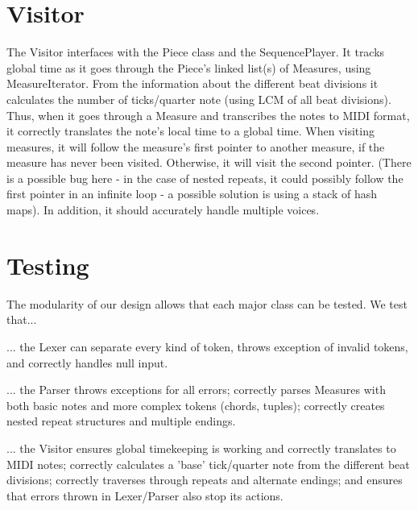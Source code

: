 \documentclass{amsart}
\begin{document}
\section{ Visitor }
The Visitor interfaces with the Piece class and the SequencePlayer.  It tracks global time as it goes through the Piece's linked list(s) of Measures, using MeasureIterator.  From the information about the different beat divisions it calculates the number of ticks/quarter note (using LCM of all beat divisions).  Thus, when it goes through a Measure and transcribes the notes to MIDI format, it correctly translates the note's local time to a global time.  When visiting measures, it will follow the measure's first pointer to another measure, if the measure has never been visited.  Otherwise, it will visit the second pointer.  (There is a possible bug here - in the case of nested repeats, it could possibly follow the first pointer in an infinite loop - a possible solution is using a stack of hash maps).  In addition, it should accurately handle multiple voices.  

\section{ Testing }
The modularity of our design allows that each major class can be tested.  We test that...

... the Lexer can separate every kind of token, throws exception of invalid tokens, and correctly handles null input.

... the Parser throws exceptions for all errors; correctly parses Measures with both basic notes and more complex tokens (chords, tuples); correctly creates nested repeat structures and multiple endings.  

... the Visitor ensures global timekeeping is working and correctly translates to MIDI notes; correctly calculates a 'base' tick/quarter note from the different beat divisions; correctly traverses through repeats and alternate endings; and ensures that errors thrown in Lexer/Parser also stop its actions.   
\end{document}
